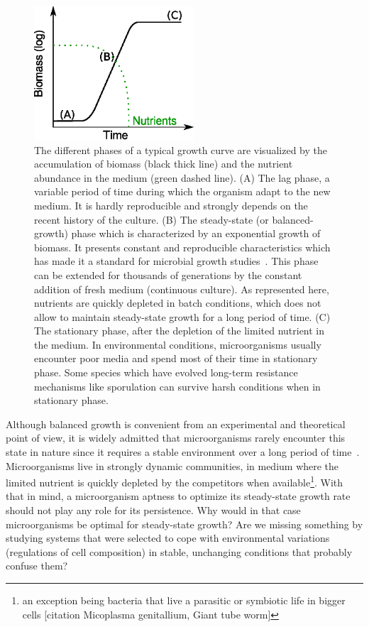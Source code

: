 \begin{figure}[!h]
\centering
\includegraphics[height=5cm]{./Fig/Chapter1/growth_curve.eps}
\caption{The different phases of a typical growth curve are visualized by the accumulation of biomass (black thick line) and the nutrient abundance in the medium (green dashed line).
(A) The lag phase, a variable period of time during which the organism adapt to the new medium.
It is hardly reproducible and strongly depends on the recent history of the culture.
(B) The steady-state (or balanced-growth) phase which is characterized by an exponential growth of biomass.
It presents constant and reproducible characteristics which has made it a standard for microbial growth studies~\cite{schaechter_microbe_2006}.
This phase can be extended for thousands of generations by the constant addition of fresh medium (continuous culture).
As represented here, nutrients are quickly depleted in batch conditions, which does not allow to maintain steady-state growth for a long period of time.
(C) The stationary phase, after the depletion of the limited nutrient in the medium.
In environmental conditions, microorganisms usually encounter poor media and spend most of their time in stationary phase.
Some species which have evolved long-term resistance mechanisms like sporulation can survive harsh conditions when in stationary phase.
}
\label{fig:growth_curve}
\end{figure}

Although balanced growth is convenient from an experimental and theoretical point of view, it is widely admitted that microorganisms rarely encounter this state in nature since it requires a stable environment over a long period of time~\cite{schaechter_microbe_2006}.
Microorganisms live in strongly dynamic communities, in medium where the limited nutrient is quickly depleted by the competitors when available\footnote{an exception being bacteria that live a parasitic or symbiotic life in bigger cells [citation Micoplasma genitallium, Giant tube worm]}.
With that in mind, a microorganism aptness to optimize its steady-state growth rate should not play any role for its persistence.
Why would in that case microorganisms be optimal for steady-state growth?
Are we missing something by studying systems that were selected to cope with environmental variations (regulations of cell composition) in stable, unchanging conditions that probably confuse them?

